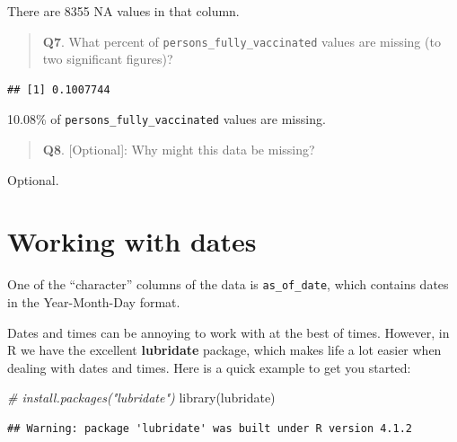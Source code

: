 \documentclass[
]{article}
\newenvironment{Shaded}{\begin{snugshade}}{\end{snugshade}}
\newcommand{\CommentTok}[1]{\textcolor[rgb]{0.56,0.35,0.01}{\textit{#1}}}
\newcommand{\FunctionTok}[1]{\textcolor[rgb]{0.00,0.00,0.00}{#1}}
\newcommand{\NormalTok}[1]{#1}
\newcommand{\SpecialCharTok}[1]{\textcolor[rgb]{0.00,0.00,0.00}{#1}}
\begin{document}
There are 8355 NA values in that column.

\begin{quote}
\textbf{Q7}. What percent of \texttt{persons\_fully\_vaccinated} values
are missing (to two significant figures)?
\end{quote}

\begin{Shaded}
\end{Shaded}

\begin{verbatim}
## [1] 0.1007744
\end{verbatim}

10.08\% of \texttt{persons\_fully\_vaccinated} values are missing.

\begin{quote}
\textbf{Q8}. {[}Optional{]}: Why might this data be missing?
\end{quote}

Optional.

\hypertarget{working-with-dates}{%
\section{Working with dates}\label{working-with-dates}}

One of the ``character'' columns of the data is \texttt{as\_of\_date},
which contains dates in the Year-Month-Day format.

Dates and times can be annoying to work with at the best of times.
However, in R we have the excellent \textbf{lubridate} package, which
makes life a lot easier when dealing with dates and times. Here is a
quick example to get you started:

\begin{Shaded}
\begin{Highlighting}[]
\CommentTok{\# install.packages("lubridate")}
\FunctionTok{library}\NormalTok{(lubridate)}
\end{Highlighting}
\end{Shaded}

\begin{verbatim}
## Warning: package 'lubridate' was built under R version 4.1.2
\end{verbatim}
\end{document}
